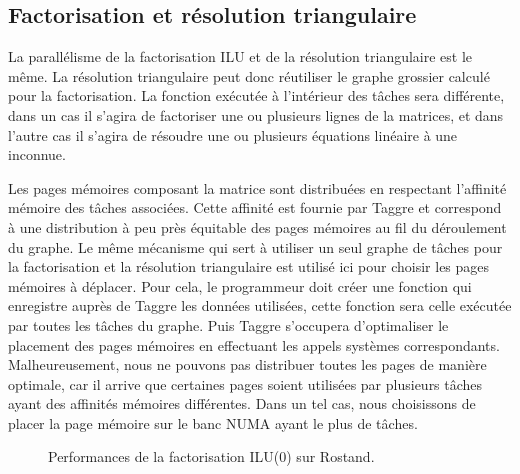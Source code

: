 \subsection{Factorisation et résolution triangulaire}
La parallélisme de la factorisation ILU et de la résolution triangulaire est le même.
%
La résolution triangulaire peut donc réutiliser le graphe grossier calculé pour la factorisation.
%
La fonction exécutée à l'intérieur des tâches sera différente, dans un cas il s'agira de factoriser une ou plusieurs lignes de la matrices, et dans l'autre cas il s'agira de résoudre une ou plusieurs équations linéaire à une inconnue.



Les pages mémoires composant la matrice sont distribuées en respectant l'affinité mémoire des tâches associées.
%
Cette affinité est fournie par Taggre et correspond à une distribution à peu près équitable des pages mémoires au fil du déroulement du graphe.
%
Le même mécanisme qui sert à utiliser un seul graphe de tâches pour la factorisation et la résolution triangulaire est utilisé ici pour choisir les pages mémoires à déplacer.
%
Pour cela, le programmeur doit créer une fonction qui enregistre auprès de Taggre les données utilisées, cette fonction sera celle exécutée par toutes les tâches du graphe.
%
Puis Taggre s'occupera d'optimaliser le placement des pages mémoires en effectuant les appels systèmes correspondants.
%
Malheureusement, nous ne pouvons pas distribuer toutes les pages de manière optimale, car il arrive que certaines pages soient utilisées par plusieurs tâches ayant des affinités mémoires différentes.
%
Dans un tel cas, nous choisissons de placer la page mémoire sur le banc NUMA ayant le plus de tâches.



\begin{figure}[!h]
     \begin{center}
    \end{center}
    \caption{Performances de la factorisation ILU(0) sur Rostand.}
\end{figure}

